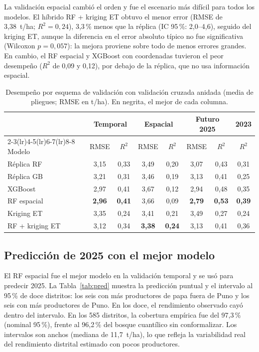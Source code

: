 \documentclass[conference,letterpaper]{IEEEtran}
\begin{document}
La validación espacial cambió el orden y fue el escenario más difícil para todos los modelos. El híbrido RF + kriging ET obtuvo el menor error (RMSE de 3,38~t/ha; $R^2=0{,}24$), 3,3\,\% menos que la réplica (IC 95\,\%: 2,0--4,6), seguido del kriging ET, aunque la diferencia en el error absoluto típico no fue significativa (Wilcoxon $p=0{,}057$): la mejora proviene sobre todo de menos errores grandes. En cambio, el RF espacial y XGBoost con coordenadas tuvieron el peor desempeño ($R^2$ de 0,09 y 0,12), por debajo de la réplica, que no usa información espacial.

\begin{table}[!t]
\caption{Desempeño por esquema de validación con validación cruzada anidada (media de pliegues; RMSE en t/ha). En negrita, el mejor de cada columna.}
\label{tab:res}
\centering
\setlength{\tabcolsep}{3.2pt}
\begin{tabular}{lccccccc}
\toprule
 & \multicolumn{2}{c}{Temporal} & \multicolumn{2}{c}{Espacial} & \multicolumn{2}{c}{Futuro 2025} & 2023 \\
\cmidrule(lr){2-3}\cmidrule(lr){4-5}\cmidrule(lr){6-7}\cmidrule(lr){8-8}
Modelo & RMSE & $R^2$ & RMSE & $R^2$ & RMSE & $R^2$ & $R^2$ \\
\midrule
Réplica RF \cite{tamayovera2025} & 3,15 & 0,33 & 3,49 & 0,20 & 3,07 & 0,43 & 0,31 \\
Réplica GB \cite{tamayovera2025} & 3,21 & 0,31 & 3,46 & 0,19 & 3,13 & 0,41 & 0,25 \\
XGBoost & 2,97 & 0,41 & 3,67 & 0,12 & 2,94 & 0,48 & 0,35 \\
RF espacial & \textbf{2,96} & \textbf{0,41} & 3,66 & 0,09 & \textbf{2,79} & \textbf{0,53} & \textbf{0,39} \\
Kriging ET & 3,35 & 0,24 & 3,41 & 0,21 & 3,49 & 0,27 & 0,24 \\
RF + kriging ET & 3,12 & 0,34 & \textbf{3,38} & \textbf{0,24} & 3,13 & 0,41 & 0,36 \\
\bottomrule
\end{tabular}
\end{table}

\subsection{Predicción de 2025 con el mejor modelo}
El RF espacial fue el mejor modelo en la validación temporal y se usó para predecir 2025. La Tabla~\ref{tab:pred} muestra la predicción puntual y el intervalo al 95\,\% de doce distritos: los seis con más productores de papa fuera de Puno y los seis con más productores de Puno. En los doce, el rendimiento observado cayó dentro del intervalo. En los 585 distritos, la cobertura empírica fue del 97,3\,\% (nominal 95\,\%), frente al 96,2\,\% del bosque cuantílico sin conformalizar. Los intervalos son anchos (mediana de 11,7~t/ha), lo que refleja la variabilidad real del rendimiento distrital estimado con pocos productores.
\end{document}
